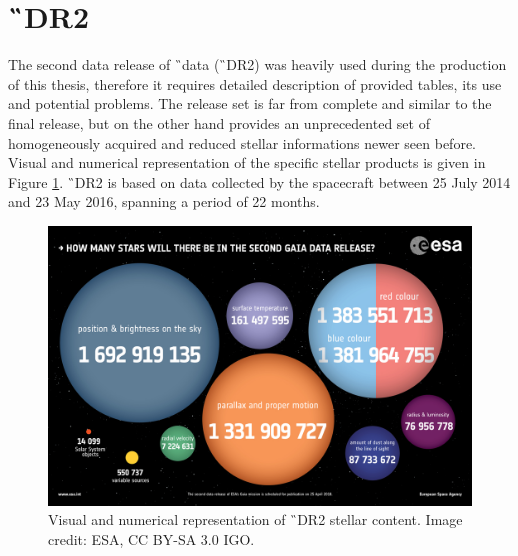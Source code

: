 \section{\G\ DR2}
\label{sec:gaia_dr2_data}
The second data release of \G\ data (\G\ DR2) was heavily used during the production of this thesis, therefore it requires detailed description of provided tables, its use and potential problems. The release set is far from complete and similar to the final release, but on the other hand provides an unprecedented set of homogeneously acquired and reduced stellar informations newer seen before. Visual and numerical representation of the specific stellar products is given in Figure \ref{fig:gaia_drs}. \G\ DR2 is based on data collected by the spacecraft between 25 July 2014 and 23 May 2016, spanning a period of 22 months. 

\begin{figure}
	\centering
	\includegraphics[width=\columnwidth]{1567214817936-Gaia_DR2_numbers_1280.jpg}
	\caption{Visual and numerical representation of \G\ DR2 stellar content. Image credit: ESA, CC BY-SA 3.0 IGO.}
	\label{fig:gaia_drs}
\end{figure}

